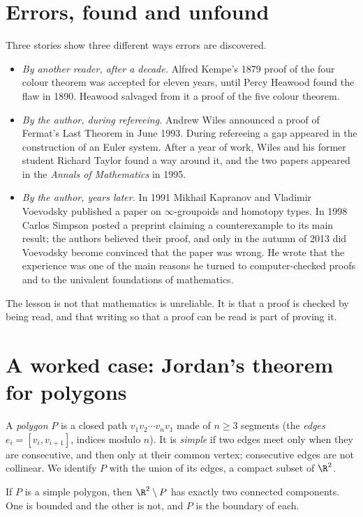 \section{Errors, found and unfound}

Three stories show three different ways errors are discovered.

\begin{itemize}
\item \emph{By another reader, after a decade.} Alfred Kempe's 1879 proof of the four colour theorem was accepted for eleven years, until Percy Heawood found the flaw in 1890.
Heawood salvaged from it a proof of the five colour theorem.
\item \emph{By the author, during refereeing.} Andrew Wiles announced a proof of Fermat's Last Theorem in June 1993. During refereeing a gap appeared in the construction of an Euler system. After a year of work,
Wiles and his former student Richard Taylor found a way around it, and the two papers appeared in the \emph{Annals of Mathematics} in 1995.
\item \emph{By the author, years later.} In 1991 Mikhail Kapranov and Vladimir Voevodsky published a paper on $\infty$-groupoids and homotopy types. In 1998 Carlos Simpson posted a preprint claiming a counterexample to its main result; the authors believed their proof, and only in the autumn of 2013 did Voevodsky
become convinced that the paper was wrong. He wrote that the experience was one of the main reasons he turned to computer-checked proofs and to the univalent foundations of mathematics.
\end{itemize}

The lesson is not that mathematics is unreliable. It is that a proof is checked by being read, and that writing so that a proof can be read is part of proving it.

\section{A worked case: Jordan's theorem for polygons}

A \emph{polygon} $P$ is a closed path $v_1v_2\cdots v_nv_1$ made of $n\ge3$ segments (the \emph{edges} $e_i=[v_i,v_{i+1}]$, indices modulo $n$). It is \emph{simple} if two edges meet only when
they are consecutive, and then only at their common vertex; consecutive edges are not collinear. We identify $P$ with the union of its edges, a compact subset of $\R^2$.

\begin{theorem}\label{thm:jordanpoly}
If $P$ is a simple polygon, then $\R^2\setminus P$ has exactly two connected components. One is bounded and the other is not, and $P$ is the boundary of each.
\end{theorem}

